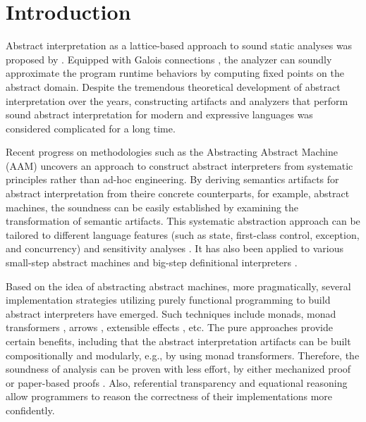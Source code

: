 \section{Introduction} \label{intro}

Abstract interpretation as a lattice-based approach to sound static
analyses was proposed by \citet{DBLP:conf/popl/CousotC77}. Equipped
with Galois connections \cite{CousotCousot79-1}, the analyzer can
soundly approximate the program runtime behaviors by computing fixed
points on the abstract domain. Despite the tremendous theoretical
development of abstract interpretation over the years, constructing
artifacts and analyzers that perform sound abstract interpretation for
modern and expressive languages was considered complicated for a long
time.

Recent progress on methodologies such as the Abstracting Abstract
Machine (AAM) \cite{DBLP:journals/jfp/HornM12, DBLP:conf/icfp/HornM10}
uncovers an approach to construct abstract interpreters from
systematic principles rather than ad-hoc engineering.  By deriving
semantics artifacts for abstract interpretation from theire concrete
counterparts, for example, abstract machines, the soundness can be
easily established by examining the transformation of semantic
artifacts.
This systematic abstraction approach can be tailored to different
language features (such as state, first-class control, exception, and
concurrency) and sensitivity analyses \cite{DBLP:conf/icfp/Gilray0M16,
  DBLP:conf/popl/GilrayL0MH16, Darais:2015:GTM:2814270.2814308}. It
has also been applied to various small-step abstract machines
\cite{DBLP:journals/jfp/HornM12, DBLP:conf/icfp/HornM10,
  Sergey:2013:MAI:2491956.2491979} and big-step definitional
interpreters \cite{Wei:2018:RAA:3243631.3236800,
  DBLP:journals/pacmpl/DaraisLNH17, Keidel:2018:CSP:3243631.3236767}.

Based on the idea of abstracting abstract machines, more
pragmatically, several implementation strategies utilizing purely
functional programming to build abstract interpreters have
emerged. Such techniques include monads, monad transformers
\cite{DBLP:journals/pacmpl/DaraisLNH17,
  Sergey:2013:MAI:2491956.2491979}, arrows
\cite{Keidel:2018:CSP:3243631.3236767}, extensible effects
\cite{Githubsemantic}, etc. The pure approaches provide certain
benefits, including that the abstract interpretation artifacts can be
built compositionally and modularly, e.g., by using monad
transformers. Therefore, the soundness of analysis can be proven with
less effort, by either mechanized proof
\cite{Darais:2016:CGC:2951913.2951934} or paper-based proofs
\cite{Keidel:2018:CSP:3243631.3236767}.  Also, referential
transparency and equational reasoning allow programmers to reason the
correctness of their implementations more confidently.


